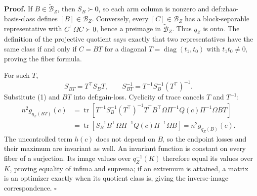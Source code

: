 \textbf{Proof.}
If \(B\in\widetilde{\mathcal B}_Z\), then \(S_B\succ0\), so each arm column is nonzero and def:zhao-basis-class defines \([B]\in\mathcal B_Z\).  Conversely, every \([C]\in\mathcal B_Z\) has a block-separable representative with \(C^{\top}\Omega C\succ0\), hence a preimage in \(\widetilde{\mathcal B}_Z\).  Thus \(q_Z\) is onto.  The definition of the projective quotient says exactly that two representatives have the same class if and only if \(C=BT\) for a diagonal \(T=\operatorname{diag}(t_1,t_0)\) with \(t_1t_0\ne0\), proving the fiber formula.

For such \(T\),
\[
S_{BT}=T^{\top}S_BT,
\qquad
S_{BT}^{-1}=T^{-1}S_B^{-1}(T^{\top})^{-1}. \tag{1}
\]
Substitute (1) and \(BT\) into def:gain-loss.  Cyclicity of trace cancels \(T\) and \(T^{-1}\):
\[
\begin{aligned}
n^2g_{q_Z(BT)}(c)
&=\operatorname{tr}\!\left[T^{-1}S_B^{-1}(T^{\top})^{-1}
T^{\top}B^{\top}\Omega\Pi^{-1}Q(c)\Pi^{-1}\Omega BT\right]\\
&=\operatorname{tr}\!\left[S_B^{-1}B^{\top}\Omega\Pi^{-1}Q(c)\Pi^{-1}\Omega B\right]
=n^2g_{q_Z(B)}(c).
\end{aligned}
\]
The uncontrolled term \(h(c)\) does not depend on \(B\), so the endpoint losses and their maximum are invariant as well.  An invariant function is constant on every fiber of a surjection.  Its image values over \(q_Z^{-1}(K)\) therefore equal its values over \(K\), proving equality of infima and suprema; if an extremum is attained, a matrix is an optimizer exactly when its quotient class is, giving the inverse-image correspondence. \(\square\)